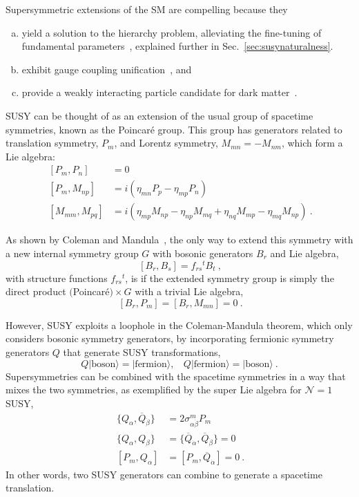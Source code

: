 Supersymmetric extensions of the SM are compelling 
because they 
\begin{enumerate}[(a)]
\item yield a solution to the hierarchy problem, alleviating
the fine-tuning of fundamental
parameters~\cite{Witten:1981nf,Dimopoulos:1981zb,Dine:1981za,Dimopoulos:1981au,Sakai:1981gr,Kaul:1981hi},
explained further in Sec.~\ref{sec:susynaturalness}.
\item exhibit gauge coupling
  unification~\cite{Dimopoulos:1981yj,Marciano:1981un,Einhorn:1981sx,Ibanez:1981yh,Amaldi:1991cn,Langacker:1995fk}, and
\item provide a weakly interacting particle candidate for dark matter~\cite{Ellis:1983ew,Jungman:1995df}.
\end{enumerate}

SUSY can be thought of as an extension of the usual group of spacetime
symmetries, known as the Poincar\'{e} group. This group has
generators related to translation symmetry, $P_m$, and Lorentz
symmetry, $M_{mn} = -M_{nm}$, which form a Lie algebra:
\begin{align}
~[P_m,P_n] &= 0 \nonumber\\
~[P_m,M_{np}] &= i(\eta_{mn}P_p-\eta_{mp}P_n) \nonumber\\
~[M_{mm},M_{pq}] &= i(\eta_{mp}M_{np} - \eta_{np}M_{mq} +
                   \eta_{nq}M_{mp} - \eta_{mq}M_{np} )~.
\label{eqn:poincare}
\end{align}

As shown by Coleman and Mandula~\cite{PhysRev.159.1251}, the only way
to extend this symmetry with a new internal symmetry group $G$ with bosonic
generators $B_r$ and Lie algebra,
\begin{equation}
~[B_r,B_s] = f_{rs}{}^tB_t~,
\end{equation}
with structure functions $f_{rs}{}^t$, is if the extended symmetry
group is simply the direct product $($Poincar\'{e}$)\times G$ with a
trivial Lie algebra,
\begin{equation}
~[B_r,P_m] = [B_r,M_{mn}] = 0~.
\end{equation}

However, SUSY exploits a loophole in the Coleman-Mandula theorem,
which only considers bosonic symmetry generators, by incorporating
fermionic symmetry generators $Q$ that generate SUSY transformations,
\begin{equation}
Q|\mathrm{boson}\rangle = |\mathrm{fermion}\rangle, ~~~~
Q|\mathrm{fermion}\rangle = |\mathrm{boson}\rangle~.
\end{equation}
Supersymmetries can be combined with the
spacetime symmetries in a way that mixes the two symmetries, as
exemplified by the super Lie algebra for $\mathcal N=1$
SUSY,
\begin{align}
~\{ Q_{\alpha},\overline Q_{\dot{\beta}}\} &= 2\sigma^m_{\alpha\dot\beta} P_m \nonumber\\
~\{ Q_{\alpha},Q_{\beta}\} &= \{ \overline Q_{\dot\alpha},\overline Q_{\dot\beta}\} = 0\nonumber\\
~[ P_m, Q_{\alpha}] &= [P_m,\overline Q_{\dot\alpha}] = 0~.
\label{eqn:n1susy}
\end{align}
In other words, two SUSY generators can combine to generate a spacetime translation.

